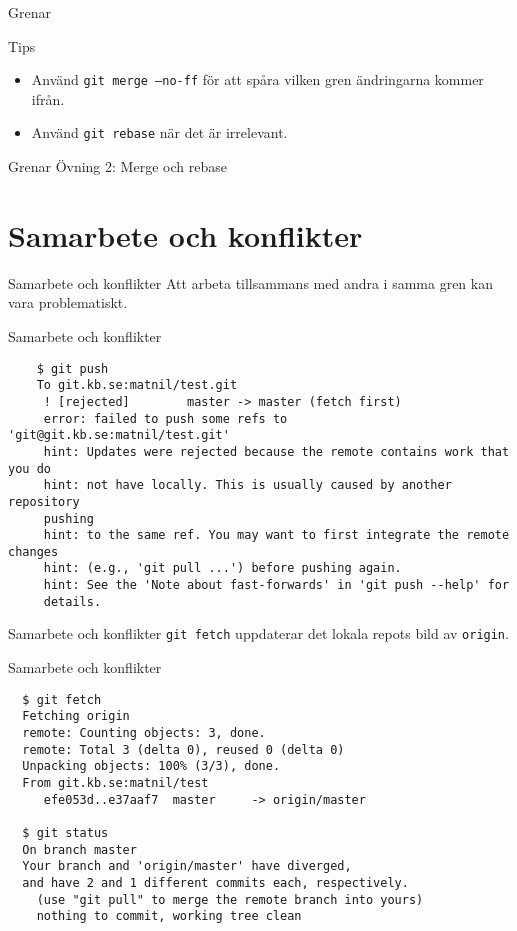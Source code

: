 \documentclass[11pt,xetex]{beamer}
\begin{document}
\begin{frame}{Grenar}
  \Large
  \begin{exampleblock}{\Huge Tips}
    \begin{itemize}
      \item Använd \texttt{git merge --no-ff} för att spåra vilken gren
          ändringarna kommer ifrån.
      \item Använd \texttt{git rebase} när det är irrelevant.
    \end{itemize}
  \end{exampleblock}
\end{frame}

\begin{frame}{Grenar}
  \Large
  Övning 2: Merge och rebase
\end{frame}

\section*{Samarbete och konflikter}

\begin{frame}{Samarbete och konflikter}
  \Large
  Att arbeta tillsammans med andra i samma gren kan vara problematiskt.
\end{frame}

\begin{frame}[fragile]{Samarbete och konflikter}
  \begin{verbatim}
    $ git push
    To git.kb.se:matnil/test.git
     ! [rejected]        master -> master (fetch first)
     error: failed to push some refs to 'git@git.kb.se:matnil/test.git'
     hint: Updates were rejected because the remote contains work that you do
     hint: not have locally. This is usually caused by another repository
     pushing
     hint: to the same ref. You may want to first integrate the remote changes
     hint: (e.g., 'git pull ...') before pushing again.
     hint: See the 'Note about fast-forwards' in 'git push --help' for
     details.
  \end{verbatim}
\end{frame}

\begin{frame}{Samarbete och konflikter}
  \Large
  \texttt{git fetch} uppdaterar det lokala repots bild av
  \texttt{origin}.
\end{frame}

\begin{frame}[fragile]{Samarbete och konflikter}
  \begin{verbatim}
  $ git fetch
  Fetching origin
  remote: Counting objects: 3, done.
  remote: Total 3 (delta 0), reused 0 (delta 0)
  Unpacking objects: 100% (3/3), done.
  From git.kb.se:matnil/test
     efe053d..e37aaf7  master     -> origin/master

  $ git status
  On branch master
  Your branch and 'origin/master' have diverged,
  and have 2 and 1 different commits each, respectively.
    (use "git pull" to merge the remote branch into yours)
    nothing to commit, working tree clean
  \end{verbatim}
\end{frame}
\end{document}
